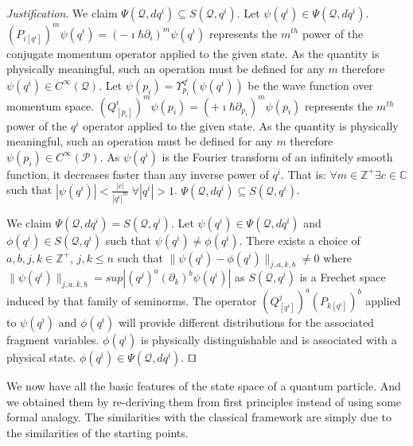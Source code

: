 \documentclass[smallextended]{svjour3}
\numberwithin{equation}{section}
\newenvironment{justification}{\emph{Justification}.}{\hfill\(\qed\)}
\theoremstyle{definition}
\newenvironment{justification}{\emph{Justification}.}{\qed}
\begin{document}
\begin{justification}
	We claim $\Psi(\mathcal{Q}, dq^i) \subseteq S(\mathcal{Q}, q^i)$. Let $\psi(q^i) \in \Psi(\mathcal{Q}, dq^i)$. $(P_{i [q^i]})^m \psi(q^i) = (-\imath \hbar \partial_i)^m \psi(q^i)$ represents the $m^{th}$ power of the conjugate momentum operator applied to the given state. As the quantity is physically meaningful, such an operation must be defined for any $m$ therefore $\psi(q^i) \in C^\infty(\mathcal{Q})$. Let $\psi(p_i) = \Upsilon^{q^i}_{p_i} (\psi(q^i))$ be the wave function over momentum space. $(Q^i_{[p_i]})^m \psi(p_i) = (+\imath \hbar \partial_{p_i})^m \psi(p_i)$ represents the $m^{th}$ power of the $q^i$ operator applied to the given state. As the quantity is physically meaningful, such an operation must be defined for any $m$ therefore $\psi(p_i) \in C^\infty(\mathcal{P})$. As $\psi(q^i)$ is the Fourier transform of an infinitely smooth function, it decreases faster than any inverse power of $q^i$. That is: $\forall m \in \mathbb{Z}^+ \exists c \in \mathbb{C}$ such that  $|\psi(q^i)|<\frac{|c|}{|q^i|^m} \; \forall |q^i|> 1$. $\Psi(\mathcal{Q}, dq^i) \subseteq S(\mathcal{Q}, q^i)$.
	
	We claim $\Psi(\mathcal{Q}, dq^i) = S(\mathcal{Q}, q^i)$. Let $\psi(q^i) \in \Psi(\mathcal{Q}, dq^i)$ and $\phi(q^i) \in S(\mathcal{Q}, q^i)$ such that $\psi(q^i) \neq \phi(q^i)$. There exists a choice of $a, b, j, k \in \mathbb{Z}^+$, $j,k \leq n$ such that $\lVert \psi(q^i) - \phi(q^i) \rVert_{j,a,k,b} \neq 0$  where $\lVert \psi(q^i) \rVert_{j,a,k,b} = sup|(q^j)^a (\partial_k) ^b \psi(q^i)|$ as $S(\mathcal{Q}, q^i)$ is a Frechet space induced by that family of seminorms. The operator $(Q^j_{[q^i]})^a(P_{k [q^i]})^b$ applied to $\psi(q^i)$ and $\phi(q^i)$ will provide different distributions for the associated fragment variables. $\phi(q^i)$ is physically distinguishable and is associated with a physical state. $\phi(q^i) \in \Psi(\mathcal{Q}, dq^i)$.
\end{justification}

We now have all the basic features of the state space of a quantum particle. And we obtained them by re-deriving them from first principles instead of using some formal analogy. The similarities with the classical framework are simply due to the similarities of the starting points.
\end{document}
